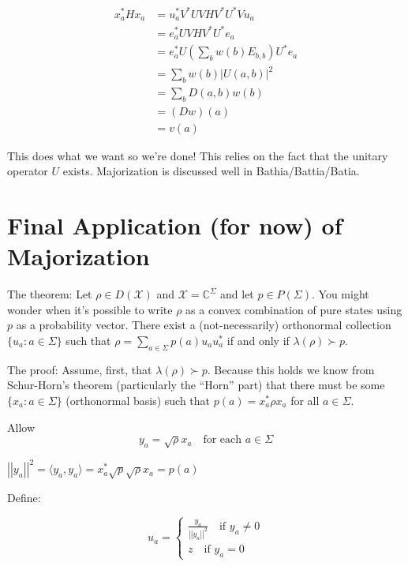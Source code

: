 \documentclass{article}
\begin{document}
        \begin{align*}
            x_a^* H x_a &= u_a^* V^* U V H V^* U^* V u_a\\
                        &= e_a^* U V H V^* U^* e_a \\
                        &= e_a^* U (\sum_{b} w(b) E_{b,b}) U^* e_a \\
                        &= \sum_b w(b) \left| U(a,b) \right|^2 \\
                        &= \sum_b D(a,b) w(b) \\
                        &= (Dw)(a) \\
                        &= v(a)
        \end{align*}
        
        This does what we want so we're done! This relies on the fact that the
        unitary operator $U$ exists. Majorization is discussed well in
        Bathia/Battia/Batia.

        \section*{Final Application (for now) of Majorization}

        The theorem: Let $\rho \in D(\mathcal{X})$ and $\mathcal{X} =
        \mathbb{C}^\Sigma$ and let $p \in P(\Sigma)$. You might wonder when it's
        possible to write $\rho$ as a convex combination of pure states using
        $p$ as a probability vector. There exist a (not-necessarily) orthonormal
        collection $\{u_a : a \in \Sigma\}$ such that $\rho = \sum\limits_{a \in
        \Sigma} p(a)u_a u_a^*$ if and only if $\lambda(\rho) \succ p$.

        The proof: Assume, first, that $\lambda(\rho) \succ p$. Because this
        holds we know from Schur-Horn's theorem (particularly the ``Horn'' part)
        that there must be some $\{x_a : a \in \Sigma\}$ (orthonormal basis) such
        that $p(a) = x_a^* \rho x_a$ for all $a \in \Sigma$.

        Allow $$ y_a = \sqrt{\rho}x_a \quad \text{for each $a \in \Sigma$} $$

        $\left| \left| y_a \right| \right|^2 = \langle y_a , y_a \rangle = x_a^*
        \sqrt{p} \sqrt{\rho} x_a = p(a)$

        Define:

        \[ 
                u_a = \begin{cases} \frac{y_a}{\left| \left| y_a \right|
                        \right|^2} \quad \text{if $y_a \ne 0$} \\ z \quad
                    \text{if $y_a = 0$} \end{cases}
        \]
        
\end{document}
